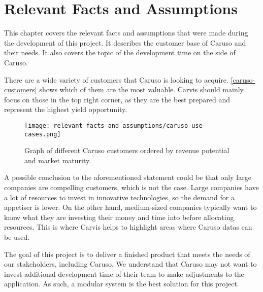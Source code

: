 \chapter{Relevant Facts and Assumptions}

This chapter covers the relevant facts and assumptions that were made during the development of this project. It describes the customer base of Caruso and their needs. It also covers the topic of the development time on the side of Caruso.

There are a wide variety of customers that Caruso is looking to acquire. \autoref{caruso-customers} shows which of them are the most valuable. Carvis should mainly focus on those in the top right corner, as they are the best prepared and represent the highest yield opportunity.

\begin{figure}[ht]
  \centering
  \texttt{[image: relevant\_facts\_and\_assumptions/caruso-use-cases.png]}
  \caption{Graph of different Caruso customers ordered by revenue potential and market maturity.}
  \label{caruso-customers}
\end{figure}

A possible conclusion to the aforementioned statement could be that only large companies are compelling customers, which is not the case. Large companies have a lot of resources to invest in innovative technologies, so the demand for a \gls{appetiser} is lower. On the other hand, medium-sized companies typically want to know what they are investing their money and time into before allocating resources. This is where Carvis helps to highlight areas where Caruso \glspl{data} can be used.

The goal of this project is to deliver a finished product that meets the needs of our \glspl{stakeholder}, including Caruso. We understand that Caruso may not want to invest additional development time of their team to make adjustments to the application. As such, a modular system is the best solution for this project.